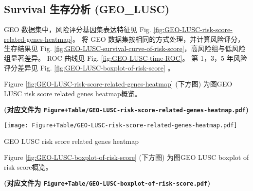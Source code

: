 \documentclass[
]{article}
\begin{document}
\begin{center}\vspace{1.5cm}\end{center}

\hypertarget{survival-ux751fux5b58ux5206ux6790-geo_lusc}{%
\subsection{Survival 生存分析 (GEO\_LUSC)}\label{survival-ux751fux5b58ux5206ux6790-geo_lusc}}

GEO 数据集中，风险评分基因集表达特征见 Fig. \ref{fig:GEO-LUSC-risk-score-related-genes-heatmap}。
将 GEO 数据集按相同的方式处理，并计算风险评分，
生存结果见 Fig. \ref{fig:GEO-LUSC-survival-curve-of-risk-score}，高风险组与低风险组显著差异。
ROC 曲线见 Fig. \ref{fig:GEO-LUSC-time-ROC}。
第 1，3，5 年风险评分差异见 Fig. \ref{fig:GEO-LUSC-boxplot-of-risk-score} 。

\begin{center}\vspace{1.5cm}\end{center}

Figure \ref{fig:GEO-LUSC-risk-score-related-genes-heatmap} (下方图) 为图GEO LUSC risk score related genes heatmap概览。

\textbf{(对应文件为 \texttt{Figure+Table/GEO-LUSC-risk-score-related-genes-heatmap.pdf})}

\def\@captype{figure}
\begin{center}
\texttt{[image: Figure+Table/GEO-LUSC-risk-score-related-genes-heatmap.pdf]}
\caption{GEO LUSC risk score related genes heatmap}\label{fig:GEO-LUSC-risk-score-related-genes-heatmap}
\end{center}

\begin{center}\vspace{1.5cm}\end{center}

\begin{center}\vspace{1.5cm}\end{center}

Figure \ref{fig:GEO-LUSC-boxplot-of-risk-score} (下方图) 为图GEO LUSC boxplot of risk score概览。

\textbf{(对应文件为 \texttt{Figure+Table/GEO-LUSC-boxplot-of-risk-score.pdf})}
\end{document}
